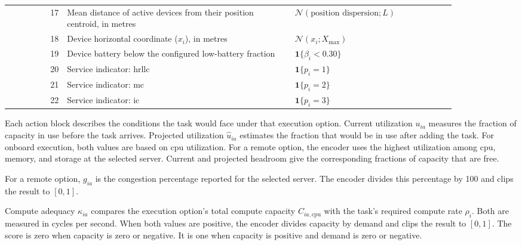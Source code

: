 \begin{table}[!htbp]
\begin{tabular}{@{}r p{0.51\linewidth} p{0.36\linewidth}@{}}
17 & Mean distance of active devices from their position centroid, in metres & \(\mathcal N(\text{position dispersion};L)\) \\
18 & Device horizontal coordinate (\(x_i\)), in metres & \(\mathcal N(x_i;X_{\max})\) \\
19 & Device battery below the configured low-battery fraction & \(\mathbf 1\{\beta_i<0.30\}\) \\
20 & Service indicator: \acs{hrllc} & \(\mathbf 1\{p_i=1\}\) \\
21 & Service indicator: \acs{mc} & \(\mathbf 1\{p_i=2\}\) \\
22 & Service indicator: \acs{ic} & \(\mathbf 1\{p_i=3\}\) \\
\bottomrule
\end{tabular}
\end{table}

Each action block describes the conditions the task would face under that execution option.
Current utilization \(u_{ia}\) measures the fraction of capacity in use before the task arrives.
Projected utilization \(\widehat u_{ia}\) estimates the fraction that would be in use after adding the task.
For onboard execution, both values are based on \acs{cpu} utilization.
For a remote option, the encoder uses the highest utilization among \acs{cpu}, memory, and storage at the selected server.
Current and projected headroom give the corresponding fractions of capacity that are free.

For a remote option, \(g_{ia}\) is the congestion percentage reported for the selected server.
The encoder divides this percentage by 100 and clips the result to \([0,1]\).

Compute adequacy \(\kappa_{ia}\) compares the execution option's total compute capacity \(C_{ia,\mathrm{cpu}}\) with the task's required compute rate \(\rho_i\).
Both are measured in cycles per second.
When both values are positive, the encoder divides capacity by demand and clips the result to \([0,1]\).
The score is zero when capacity is zero or negative.
It is one when capacity is positive and demand is zero or negative.

